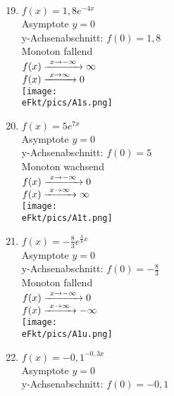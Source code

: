 \begin{Answer}[ref=eFktA1]
	\begin{minipage}{\textwidth}
		\begin{minipage}[t]{0.49\textwidth}
			\begin{enumerate}[label=\alph*)]
				\setcounter{enumi}{18}
				\item \(f(x)=1,8e^{-4x}\)\\
				Asymptote \(y=0\)\\
				y-Achsenabschnitt: \(f(0)=1,8\)\\
				Monoton fallend\\
				\(f(x)\xrightarrow{\hphantom{\ }x\to-\infty\hphantom{\ }}\infty\)\\
				\(f(x)\xrightarrow{\hphantom{\ }x\to\infty\hphantom{\ }}0\)\\
				\texttt{[image: \\eFkt/pics/A1s.png]}
				\item \(f(x)=5e^{7x}\)\\
				Asymptote \(y=0\)\\
				y-Achsenabschnitt: \(f(0)=5\)\\
				Monoton wachsend\\
				\(f(x)\xrightarrow{\hphantom{\ }x\to-\infty\hphantom{\ }}0\)\\
				\(f(x)\xrightarrow{\hphantom{\ }x\to\infty\hphantom{\ }}\infty\)\\
				\texttt{[image: \\eFkt/pics/A1t.png]}
				\item \(f(x)=-\frac{8}{3}e^{\frac{3}{8}x}\)\\
				Asymptote \(y=0\)\\
				y-Achsenabschnitt: \(f(0)=-\frac{8}{3}\)\\
				Monoton fallend\\
				\(f(x)\xrightarrow{\hphantom{\ }x\to-\infty\hphantom{\ }}0\)\\
				\(f(x)\xrightarrow{\hphantom{\ }x\to\infty\hphantom{\ }}-\infty\)\\
				\texttt{[image: \\eFkt/pics/A1u.png]}
			\end{enumerate}
		\end{minipage}
		\begin{minipage}[t]{0.49\textwidth}
			\begin{enumerate}[label=\alph*)]
				\setcounter{enumi}{21}
				\item \(f(x)=-0,1^{-0,3x}\)\\
				Asymptote \(y=0\)\\
				y-Achsenabschnitt: \(f(0)=-0,1\)\\

\end{enumerate}
\end{minipage}
\end{minipage}
\end{Answer}
